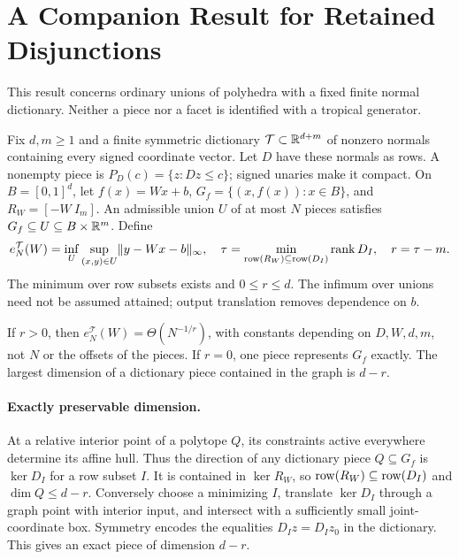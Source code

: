 \section{A Companion Result for Retained Disjunctions}\label{app:dictionary}
This result concerns ordinary unions of polyhedra with a fixed finite normal dictionary. Neither a piece nor a facet is identified with a tropical generator.

Fix $d,m\ge1$ and a finite symmetric dictionary $\mathcal T\subset\mathbb R^{d+m}$ of nonzero normals containing every signed coordinate vector. Let $D$ have these normals as rows. A nonempty piece is $P_D(c)=\{z:Dz\le c\}$; signed unaries make it compact. On $B=[0,1]^d$, let $f(x)=Wx+b$, $G_f=\{(x,f(x)):x\in B\}$, and $R_W=[-W\ I_m]$. An admissible union $U$ of at most $N$ pieces satisfies $G_f\subseteq U\subseteq B\times\mathbb R^m$. Define
\[
e_N^\mathcal T(W)=\inf_U\sup_{(x,y)\in U}\lVert y-Wx-b\rVert_\infty,\quad
\tau=\min_{\operatorname{row}(R_W)\subseteq\operatorname{row}(D_I)}\operatorname{rank} D_I,\quad r=\tau-m.
\]
The minimum over row subsets exists and $0\le r\le d$. The infimum over unions need not be assumed attained; output translation removes dependence on $b$.

\begin{theorem}\label{thm:dictionary}
If $r>0$, then $e_N^\mathcal T(W)=\Theta(N^{-1/r})$, with constants depending on $D,W,d,m$, not $N$ or the offsets of the pieces. If $r=0$, one piece represents $G_f$ exactly. The largest dimension of a dictionary piece contained in the graph is $d-r$.
\end{theorem}

\paragraph{Exactly preservable dimension.}
At a relative interior point of a polytope $Q$, its constraints active everywhere determine its affine hull. Thus the direction of any dictionary piece $Q\subseteq G_f$ is $\ker D_I$ for a row subset $I$. It is contained in $\ker R_W$, so $\operatorname{row}(R_W)\subseteq\operatorname{row}(D_I)$ and $\dim Q\le d-r$. Conversely choose a minimizing $I$, translate $\ker D_I$ through a graph point with interior input, and intersect with a sufficiently small joint-coordinate box. Symmetry encodes the equalities $D_Iz=D_Iz_0$ in the dictionary. This gives an exact piece of dimension $d-r$.

